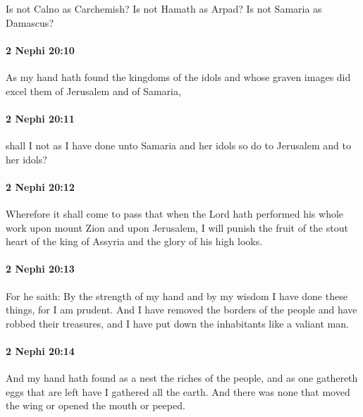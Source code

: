 			Is not Calno as Carchemish?
			Is not Hamath as Arpad?
			Is not Samaria as Damascus?

		\paragraph{2 Nephi 20:10} %
			\label{2NEPHI-20-10}

			As my hand hath found the kingdoms of the idols
			and whose graven images did excel them of Jerusalem and of Samaria,

		\paragraph{2 Nephi 20:11} %
			\label{2NEPHI-20-11}

			shall I not as I have done unto Samaria and her idols
			so do to Jerusalem and to her idols?

		\paragraph{2 Nephi 20:12} %
			\label{2NEPHI-20-12}

			Wherefore it shall come to pass that
			when the Lord hath performed his whole work
			upon mount Zion and upon Jerusalem,
			I will punish the fruit of the stout heart of the king of Assyria
			and the glory of his high looks.

		\paragraph{2 Nephi 20:13} %
			\label{2NEPHI-20-13}

			For he saith:
			By the strength of my hand and by my wisdom
			I have done these things,
			for I am prudent.
			And I have removed the borders of the people and have robbed their treasures,
			and I have put down the inhabitants like a valiant man.

		\paragraph{2 Nephi 20:14} %
			\label{2NEPHI-20-14}

			And my hand hath found as a nest the riches of the people,
			and as one gathereth eggs that are left have I gathered all the earth.
			And there was none that moved the wing or opened the mouth or peeped.

